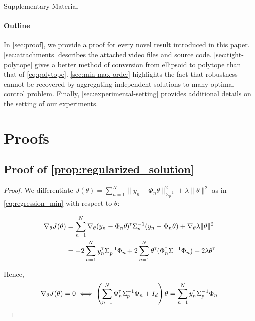 \documentclass{article}
\begin{document}
\clearpage



\clearpage
\onecolumn
\appendix

\begin{center}
	\LARGE Supplementary Material
\end{center}

\paragraph{Outline}
In \autoref{sec:proof}, we provide a proof for every novel result introduced in this paper. \autoref{sec:attachments} describes the attached video files and source code. \autoref{sec:tight-polytope} gives a better method of conversion from ellipsoid to polytope than that of \eqref{eq:polytope}. \autoref{sec:min-max-order} highlights the fact that robustness cannot be recovered by aggregating independent solutions to many optimal control problem. Finally, \autoref{sec:experimental-setting} provides additional details on the setting of our experiments.

\section{Proofs}
\label{sec:proof}

\subsection{Proof of \autoref{prop:regularized_solution}}

\begin{proof}
We differentiate $J(\theta) = \sum_{n=1}^N \|y_n -\Phi_n\theta\|_{\Sigma_p^{-1}}^2 + \lambda\|\theta\|_{}^2$ as in  \eqref{eq:regression_min} with respect to $\theta$:

\begin{align*}
    \nabla_{\theta} J(\theta) &= \sum_{n=1}^N\nabla_{\theta} (y_n - \Phi_n\theta)^{\mathsf{\scriptscriptstyle T}}\Sigma_p^{-1}(y_n - \Phi_n\theta) + \nabla_{\theta} \lambda\|\theta\|_{}^2\\
    &= -2\sum_{n=1}^N y_n^{\mathsf{\scriptscriptstyle T}}\Sigma_p^{-1}\Phi_n + 2\sum_{n=1}^N\theta^{\mathsf{\scriptscriptstyle T}}(\Phi_n^{\mathsf{\scriptscriptstyle T}}\Sigma^{-1}\Phi_n) +  2 \lambda \theta^{\mathsf{\scriptscriptstyle T}}
\end{align*}

Hence,
\begin{align*}
    \nabla_{\theta} J(\theta) = 0 \iff \left(\sum_{n=1}^N\Phi_n^{\mathsf{\scriptscriptstyle T}}\Sigma_p^{-1}\Phi_n + I_d\right)\theta = \sum_{n=1}^N y_n^{\mathsf{\scriptscriptstyle T}}\Sigma_p^{-1}\Phi_n
\end{align*}
\end{proof}
\end{document}
